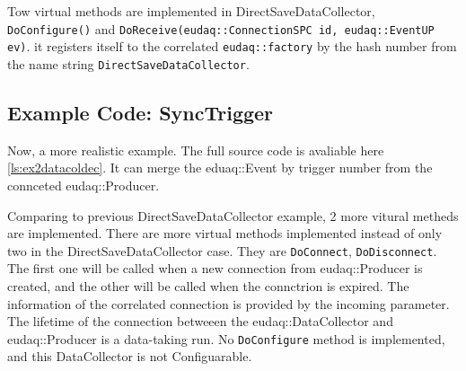 Tow virtual methods are implemented in DirectSaveDataCollector, \lstinline[style=cpp]{DoConfigure()} and \lstinline[style=cpp]{DoReceive(eudaq::ConnectionSPC id, eudaq::EventUP ev)}. it registers itself to the correlated \lstinline[style=cpp]{eudaq::factory} by the hash number from the name string \lstinline[style=cpp]{DirectSaveDataCollector}. 

\subsection{Example Code: SyncTrigger}\label{sec:ex2datacollector_cc}
Now, a more realistic example. The full source code is avaliable here \autoref{ls:ex2datacoldec}. It can merge the eduaq::Event by trigger number from the connceted eudaq::Producer.

Comparing to previous DirectSaveDataCollector example, 2 more vitural metheds are implemented. There are more virtual methods implemented instead of only two in the DirectSaveDataCollector case. They are \lstinline[style=cpp]{DoConnect}, \lstinline[style=cpp]{DoDisconnect}. The first one will be called when a new connection from eudaq::Producer is created, and the other will be called  when the connctrion is expired. The information of the correlated connection is provided by the incoming parameter. The lifetime of the connection betweeen the eudaq::DataCollector and eudaq::Producer is a data-taking run. No \lstinline[style=cpp]{DoConfigure} method is implemented, and this DataCollector is not Configuarable.









